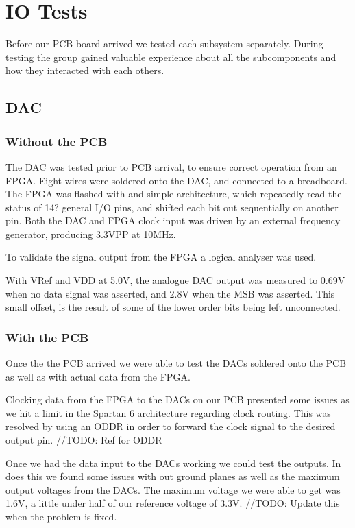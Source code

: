 \section{IO Tests}
Before our PCB board arrived we tested each subsystem separately.
During testing the group gained valuable experience about all the subcomponents and how they interacted with each others.

\subsection{DAC}

\subsubsection{Without the PCB}

The DAC was tested prior to PCB arrival, to ensure correct operation from an FPGA.
Eight wires were soldered onto the DAC, and connected to a breadboard.
The FPGA was flashed with and simple architecture, which repeatedly read the status of 14? general I/O pins, and shifted each bit out sequentially on another pin.
Both the DAC and FPGA clock input was driven by an external frequency generator, producing 3.3VPP at 10MHz.

To validate the signal output from the FPGA a logical analyser was used.

With VRef and VDD at 5.0V, the analogue DAC output was measured to 0.69V when no data signal was asserted, and 2.8V when the MSB was asserted. This small offset, is the result of some of the lower order bits being left unconnected.

\subsubsection{With the PCB}

Once the the PCB arrived we were able to test the DACs soldered onto the PCB as well as with actual data from the FPGA.

Clocking data from the FPGA to the DACs on our PCB presented some issues as we hit a limit in the Spartan 6 architecture regarding clock routing. This was resolved by using an ODDR in order to forward the clock signal to the desired output pin. //TODO: Ref for ODDR

Once we had the data input to the DACs working we could test the outputs. In does this we found some issues with out ground planes as well as the maximum output voltages from the DACs. The maximum voltage we were able to get was 1.6V, a little under half of our reference voltage of 3.3V. //TODO: Update this when the problem is fixed.


